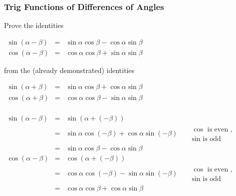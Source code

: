 \begin{frame}
\frametitle{Trig Functions of Differences of Angles}
\begin{example} 
Prove the identities

\hfil \hfil $\begin{array}{rcl}
\sin (\alpha- \beta)&= & \sin\alpha\cos\beta -\cos \alpha\sin \beta \\
\cos(\alpha-\beta)&=&\cos\alpha\cos \beta +\sin\alpha\sin\beta
\end{array}$

from the (already demonstrated) identities

\hfil \hfil $\begin{array}{rcl}
\sin (\alpha+ \beta)&= & \sin\alpha\cos\beta +\cos \alpha \sin \beta \\
\cos(\alpha+\beta)&=&\cos\alpha\cos \beta -\sin\alpha\sin\beta\\
\end{array}
$

$
\begin{array}{rcll|l}
\sin (\alpha-\beta) &=&\sin (\alpha+(-\beta))\\
&=&\sin \alpha \cos (-\beta) +\cos\alpha\sin (-\beta) && \begin{array}{l}\cos \text{ is even },\\ \sin \text{ is odd}\end{array} \\
&=&\sin \alpha \cos \beta -\cos\alpha \sin \beta\\
\cos (\alpha-\beta) &=&\cos (\alpha+(-\beta))\\
&=&\cos \alpha \cos (-\beta) -\sin \alpha\sin(-\beta) && \begin{array}{l}\cos \text{ is even },\\ \sin \text{ is odd}\end{array} \\
&=&\cos \alpha \cos \beta +\cos\alpha \sin \beta
\end{array}
$


\end{example}
\vskip 10cm
\end{frame}
